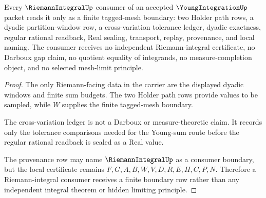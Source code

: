 \begin{theorem}
\label{thm:young-integration-riemann-boundary}
Every $\RiemannIntegralUp$ consumer of an accepted $\YoungIntegrationUp$ packet reads it only as a finite tagged-mesh boundary: two Holder path rows, a dyadic partition-window row, a cross-variation tolerance ledger, dyadic exactness, regular rational readback, Real sealing, transport, replay, provenance, and local naming. The consumer receives no independent Riemann-integral certificate, no Darboux gap claim, no quotient equality of integrands, no measure-completion object, and no selected mesh-limit principle.
\end{theorem}
\begin{proof}
The only Riemann-facing data in the carrier are the displayed dyadic windows and finite sum budgets. The two Holder path rows provide values to be sampled, while $W$ supplies the finite tagged-mesh boundary.

The cross-variation ledger is not a Darboux or measure-theoretic claim. It records only the tolerance comparisons needed for the Young-sum route before the regular rational readback is sealed as a Real value.

The provenance row may name $\RiemannIntegralUp$ as a consumer boundary, but the local certificate remains $F,G,A,B,W,V,D,R,E,H,C,P,N$. Therefore a Riemann-integral consumer receives a finite boundary row rather than any independent integral theorem or hidden limiting principle.
\end{proof}

